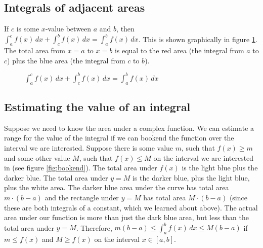 \subsection{Integrals of adjacent areas}
If $c$ is some $x$-value between $a$ and $b$, then $\int_a^c f(x)\,dx 
+ \int_c^b f(x)\,dx = \int_a^b f(x)\,dx$. This is shown graphically in 
figure \ref{fig:adjacent}. The total area from $x=a$ to $x=b$ is equal 
to the red area (the integral from $a$ to $c$) plus the blue area (the 
integral from $c$ to $b$). 

\begin{figure}[htbp]
	\centering
	\caption{$\int_a^c f(x)\,dx + \int_c^b f(x)\,dx = \int_a^b f(x)\,dx$}
	\label{fig:adjacent}
\end{figure}

\subsection{Estimating the value of an integral}
Suppose we need to know the area under a complex function. We can 
estimate a range for the value of the integral if we can bookend the 
function over the interval we are interested. Suppose there is some 
value $m$, such that $f(x) \geq m$ and some other value $M$, such that 
$f(x) \leq M$ on the interval we are interested in (see figure 
\ref{fig:bookend}). The total area under $f(x)$ is the light blue 
plus the darker blue. The total area under $y=M$ is the darker blue, 
plus the light blue, plus the white area. The darker blue area under 
the curve has total area $m \cdot (b - a)$ and the rectangle under 
$y=M$ has total area $M \cdot (b - a)$ (since these are both integrals 
of a constant, which we learned about above). The actual area under our 
function is more than just the dark blue area, but less than the total 
area under $y=M$. Therefore, $m(b - a) \leq \int_a^b f(x)\,dx \leq 
M(b -a)$ if $m \leq f(x)$ and $M \geq f(x)$ on the interval $x \in 
[a, b]$. 

